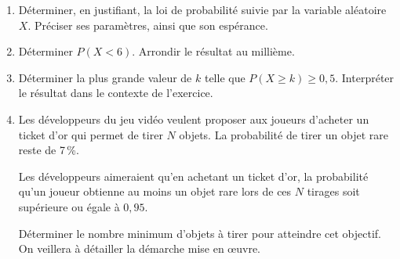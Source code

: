 \medskip

\begin{enumerate}
\item Déterminer, en justifiant, la loi de probabilité suivie par la variable aléatoire $X$. Préciser ses paramètres, ainsi que son espérance.
\item Déterminer $P(X < 6)$. Arrondir le résultat au millième.
\item Déterminer la plus grande valeur de $k$ telle que $P(X \geqslant k) \geqslant 0,5$. Interpréter le résultat dans le contexte de l'exercice.
\item Les développeurs du jeu vidéo veulent proposer aux joueurs d'acheter un \og ticket
d'or \fg{} qui permet de tirer $N$ objets. La probabilité de tirer un objet rare reste de 7\,\%.

Les développeurs aimeraient qu'en achetant un ticket d'or, la probabilité qu'un joueur obtienne au moins un objet rare lors de ces $N$ tirages soit supérieure ou égale à $0,95$.

Déterminer le nombre minimum d'objets à tirer pour atteindre cet objectif. On veillera à détailler la démarche mise en œuvre.
\end{enumerate}

